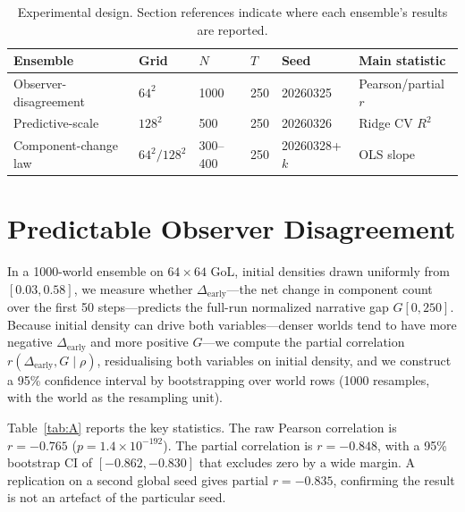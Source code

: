 \documentclass[11pt,a4paper]{article}
\newcommand{\Dearly}{\Delta_{\mathrm{early}}}
\begin{document}
\begin{table}[H]
\centering
\caption{Experimental design. Section references indicate where each
ensemble's results are reported.}
\label{tab:design}
\begin{tabular}{p{4.8cm}llllp{3cm}}
\toprule
Ensemble & Grid & $N$ & $T$ & Seed & Main statistic \\
\midrule
Observer-disagreement  & $64^2$         & 1000     & 250 & 20260325      & Pearson/partial $r$ \\
Predictive-scale       & $128^2$        & 500      & 250 & 20260326      & Ridge CV $R^2$ \\
Component-change law   & $64^2/128^2$   & 300--400 & 250 & 20260328+$k$  & OLS slope \\
\bottomrule
\end{tabular}
\end{table}

\section{Predictable Observer Disagreement}
\label{sec:A}

In a 1000-world ensemble on $64\times64$ GoL, initial densities drawn
uniformly from $[0.03,0.58]$, we measure whether $\Dearly$---the net change
in component count over the first 50 steps---predicts the full-run normalized
narrative gap $G[0,250]$.
Because initial density can drive both variables---denser worlds tend to have
more negative $\Dearly$ and more positive $G$---we compute the partial
correlation
$r(\Dearly, G\mid\rho)$, residualising both variables on initial density,
and we construct a 95\% confidence interval by bootstrapping over world rows
(1000 resamples, with the world as the resampling unit).

Table~\ref{tab:A} reports the key statistics.
The raw Pearson correlation is $r=-0.765$ ($p=1.4\times10^{-192}$).
The partial correlation is $r=-0.848$, with a 95\% bootstrap CI of
$[-0.862,-0.830]$ that excludes zero by a wide margin.
A replication on a second global seed gives partial $r=-0.835$,
confirming the result is not an artefact of the particular seed.
\end{document}

